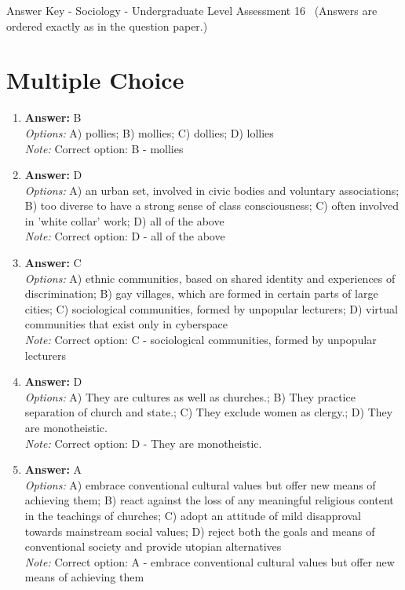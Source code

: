 \documentclass[12pt]{article}
\begin{document}
\begin{center}
Answer Key - Sociology - Undergraduate Level Assessment 16 \
\small (Answers are ordered exactly as in the question paper.)
\end{center}

\section*{Multiple Choice}
\begin{enumerate}[label=\arabic*.]
\item \textbf{Answer:} B
\\ \textit{Options:} A) pollies; B) mollies; C) dollies; D) lollies
\\ \textit{Note:} Correct option: B - mollies
\item \textbf{Answer:} D
\\ \textit{Options:} A) an urban set, involved in civic bodies and voluntary associations; B) too diverse to have a strong sense of class consciousness; C) often involved in 'white collar' work; D) all of the above
\\ \textit{Note:} Correct option: D - all of the above
\item \textbf{Answer:} C
\\ \textit{Options:} A) ethnic communities, based on shared identity and experiences of discrimination; B) gay villages, which are formed in certain parts of large cities; C) sociological communities, formed by unpopular lecturers; D) virtual communities that exist only in cyberspace
\\ \textit{Note:} Correct option: C - sociological communities, formed by unpopular lecturers
\item \textbf{Answer:} D
\\ \textit{Options:} A) They are cultures as well as churches.; B) They practice separation of church and state.; C) They exclude women as clergy.; D) They are monotheistic.
\\ \textit{Note:} Correct option: D - They are monotheistic.
\item \textbf{Answer:} A
\\ \textit{Options:} A) embrace conventional cultural values but offer new means of achieving them; B) react against the loss of any meaningful religious content in the teachings of churches; C) adopt an attitude of mild disapproval towards mainstream social values; D) reject both the goals and means of conventional society and provide utopian alternatives
\\ \textit{Note:} Correct option: A - embrace conventional cultural values but offer new means of achieving them
\end{enumerate}
\end{document}
